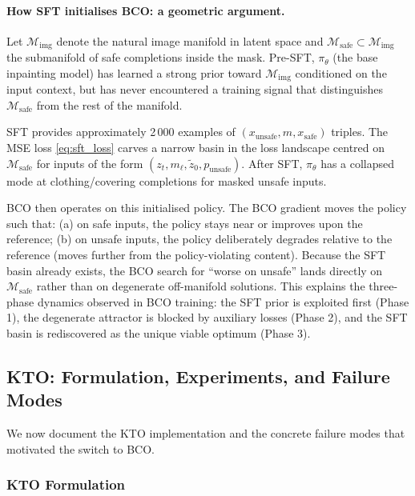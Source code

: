 \paragraph{How SFT initialises BCO: a geometric argument.}
Let $\mathcal{M}_\text{img}$ denote the natural image manifold in latent
space and $\mathcal{M}_\text{safe} \subset \mathcal{M}_\text{img}$ the
submanifold of safe completions inside the mask.
Pre-SFT, $\pi_\theta$ (the base inpainting model) has learned a strong
prior toward $\mathcal{M}_\text{img}$ conditioned on the input context, but
has never encountered a training signal that distinguishes
$\mathcal{M}_\text{safe}$ from the rest of the manifold.

SFT provides approximately 2\,000 examples of $(x_\text{unsafe}, m,
x_\text{safe})$ triples.
The MSE loss \eqref{eq:sft_loss} carves a narrow basin in the loss
landscape centred on $\mathcal{M}_\text{safe}$ for inputs of the form
$(z_t, m_\ell, \tilde{z}_0, p_\text{unsafe})$.
After SFT, $\pi_\theta$ has a collapsed mode at clothing/covering
completions for masked unsafe inputs.

BCO then operates on this initialised policy.
The BCO gradient moves the policy such that:
(a) on safe inputs, the policy stays near or improves upon the reference;
(b) on unsafe inputs, the policy deliberately degrades relative to the
reference (moves further from the policy-violating content).
Because the SFT basin already exists, the BCO search for ``worse on
unsafe'' lands directly on $\mathcal{M}_\text{safe}$ rather than on
degenerate off-manifold solutions.
This explains the three-phase dynamics observed in BCO training: the SFT prior
is exploited first (Phase 1), the degenerate attractor is blocked by
auxiliary losses (Phase 2), and the SFT basin is rediscovered as the
unique viable optimum (Phase 3).

\subsection{KTO: Formulation, Experiments, and Failure Modes}
\label{app:kto_to_bco}

We now document the KTO implementation and the concrete failure modes that motivated the switch to BCO.

\subsubsection{KTO Formulation}


